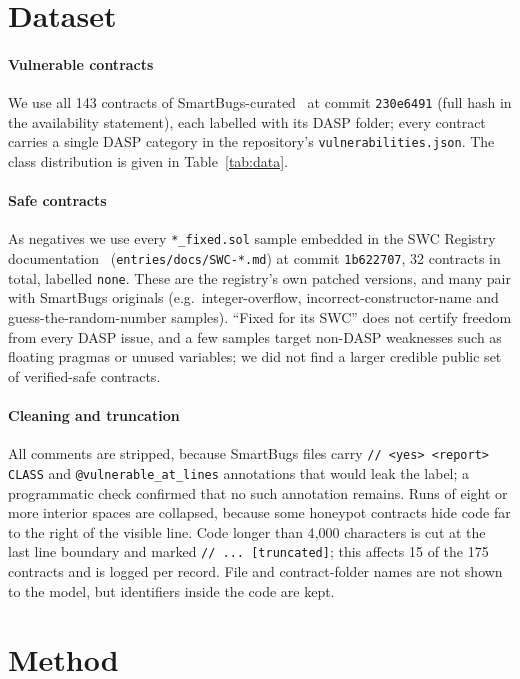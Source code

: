 \section{Dataset}\label{sec:data}
\paragraph{Vulnerable contracts}
We use all 143 contracts of SmartBugs-curated~\cite{smartbugscurated} at commit \texttt{230e6491} (full hash in the availability statement), each labelled with its DASP folder; every contract carries a single DASP category in the repository's \texttt{vulnerabilities.json}. The class distribution is given in Table~\ref{tab:data}.

\paragraph{Safe contracts}
As negatives we use every \texttt{*\_fixed.sol} sample embedded in the SWC Registry documentation~\cite{swcregistry} (\texttt{entries/docs/SWC-*.md}) at commit \texttt{1b622707}, 32 contracts in total, labelled \texttt{none}. These are the registry's own patched versions, and many pair with SmartBugs originals (e.g.\ integer-overflow, incorrect-constructor-name and guess-the-random-number samples). ``Fixed for its SWC'' does not certify freedom from every DASP issue, and a few samples target non-DASP weaknesses such as floating pragmas or unused variables; we did not find a larger credible public set of verified-safe contracts.



\paragraph{Cleaning and truncation}
All comments are stripped, because SmartBugs files carry \texttt{// <yes> <report> CLASS} and \texttt{@vulnerable\_at\_lines} annotations that would leak the label; a programmatic check confirmed that no such annotation remains. Runs of eight or more interior spaces are collapsed, because some honeypot contracts hide code far to the right of the visible line. Code longer than 4{,}000 characters is cut at the last line boundary and marked \texttt{// ... [truncated]}; this affects 15 of the 175 contracts and is logged per record. File and contract-folder names are not shown to the model, but identifiers inside the code are kept.

\section{Method}\label{sec:method}
